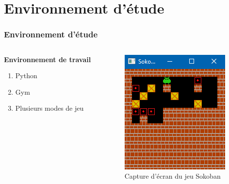 \documentclass[
	11pt, %
]{beamer}
\begin{document}
\section{Environnement d'étude}

\begin{frame}
	\frametitle{Environnement d'étude}
	
	\begin{columns}[c] %
		\begin{column}{0.45\textwidth} %
			\textbf{Environnement de travail}
			\begin{enumerate}
				\item Python
				\item Gym
				\item Plusieurs modes de jeu
			\end{enumerate}
		\end{column}
		\begin{column}{0.5\textwidth} %
	
		\begin{figure}
			\centering
			\includegraphics[width=0.9\linewidth]{Images/sokoban.png}
			\caption{Capture d'écran du jeu Sokoban}
		\end{figure}
		\end{column}
	\end{columns}
\end{frame}
\end{document}
